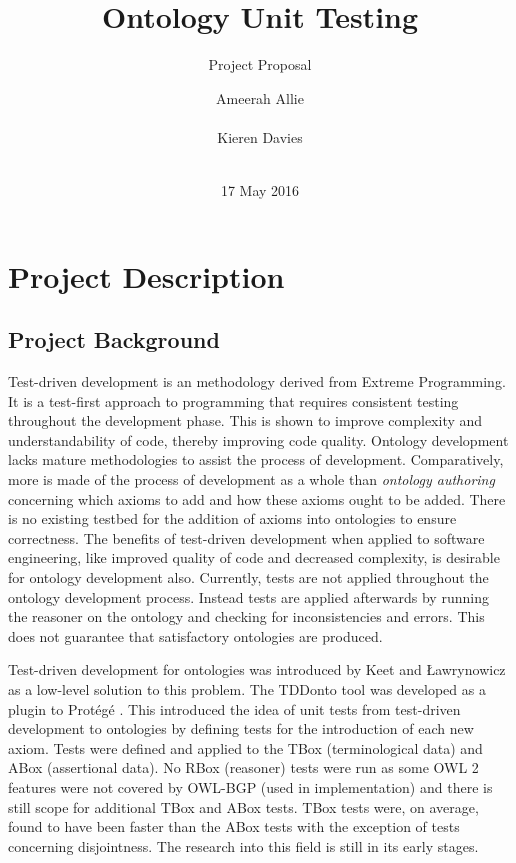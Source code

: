 \documentclass[draft]{sig-alternate}
\begin{document}
\title{Ontology Unit Testing}
\subtitle{Project Proposal}
\author{
  \alignauthor
  Ameerah Allie\\
    \\
  \alignauthor
  Kieren Davies\\
   \\
}
\date{17 May 2016}
\maketitle

\section{Project Description}

\subsection{Project Background}

Test-driven development is an methodology derived from Extreme Programming. It is a test-first approach to programming that requires consistent testing throughout the development phase. This is shown to improve complexity and understandability of code, thereby improving code quality. Ontology development lacks mature methodologies to assist the process of development. Comparatively, more is made of the process of development as a whole than \textit{ontology authoring} concerning which axioms to add and how these axioms ought to be added. There is no existing testbed for the addition of axioms into ontologies to ensure correctness. The benefits of test-driven development when applied to software engineering, like improved quality of code and decreased complexity, is desirable for ontology development also. Currently, tests are not applied throughout the ontology development process. Instead tests are applied afterwards by running the reasoner on the ontology and checking for inconsistencies and errors. This does not guarantee that satisfactory ontologies are produced.

Test-driven development for ontologies was introduced by Keet and {\L}awrynowicz \cite{DBLP:journals/corr/KeetL15} as a low-level solution to this problem. The TDDonto tool was developed as a plugin to Prot\'eg\'e \cite{DBLP:conf/dlog/LawrynowiczK16}. This introduced the idea of unit tests from test-driven development to ontologies by defining tests for the introduction of each new axiom. Tests were defined and applied to the TBox (terminological data) and ABox (assertional data). No RBox (reasoner) tests were run as some OWL 2 features were not covered by OWL-BGP (used in implementation) and there is still scope for additional TBox and ABox tests. TBox tests were, on average, found to have been faster than the ABox tests with the exception of tests concerning disjointness. The research into this field is still in its early stages.
\end{document}
